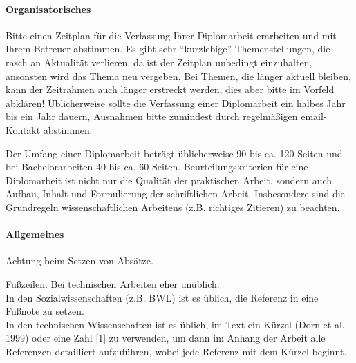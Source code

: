 \paragraph{Organisatorisches}
\makeatletter\ifthesis@masterthesis
Bitte einen Zeitplan für die Verfassung Ihrer Diplomarbeit erarbeiten und mit Ihrem Betreuer abstimmen. Es gibt sehr \enquote{kurzlebige} Themenstellungen, die rasch an Aktualität verlieren, da ist der Zeitplan unbedingt einzuhalten, ansonsten wird das Thema neu vergeben. Bei Themen, die länger aktuell bleiben, kann der Zeitrahmen auch länger erstreckt werden, dies aber bitte im Vorfeld abklären! Üblicherweise sollte die Verfassung einer Diplomarbeit ein halbes Jahr bis ein Jahr dauern, Ausnahmen bitte zumindest durch regelmäßigen email-Kontakt abstimmen.
\fi\makeatother

Der Umfang einer Diplomarbeit beträgt üblicherweise 90 bis ca. 120 Seiten und bei Bachelorarbeiten 40 bis ca. 60 Seiten. Beurteilungskriterien für eine Diplomarbeit ist nicht nur die Qualität der praktischen Arbeit, sondern auch Aufbau, Inhalt und Formulierung der schriftlichen Arbeit. Insbesondere sind die Grundregeln wissenschaftlichen Arbeitens (z.B. richtiges Zitieren) zu beachten.

\paragraph{Allgemeines}
Achtung beim Setzen von Absätze.

Fußzeilen: Bei technischen Arbeiten eher unüblich. \\
In den Sozialwissenschaften (z.B. BWL) ist es üblich, die Referenz in eine Fußnote zu setzen.
\\
In den technischen Wissenschaften ist es üblich, im Text ein Kürzel (Dorn et al. 1999) oder eine Zahl [1] zu verwenden, um dann im Anhang der Arbeit alle Referenzen detailliert aufzuführen, wobei jede Referenz mit dem Kürzel beginnt.

